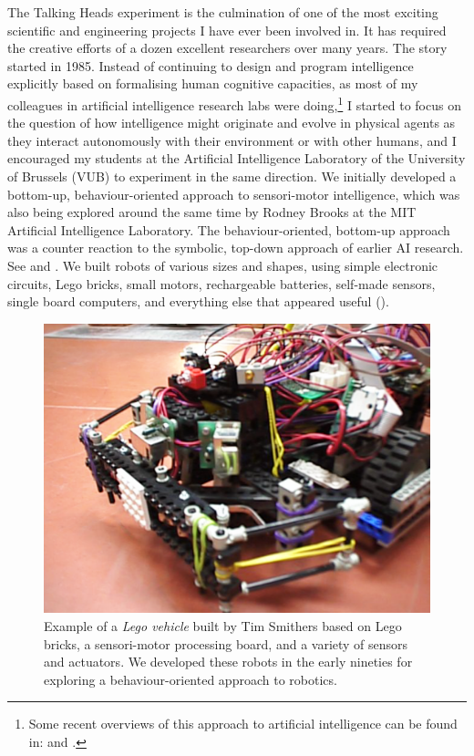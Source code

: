 The Talking Heads experiment is the culmination of one of
the most exciting scientific and engineering projects I have
ever been involved in. It has required the
creative efforts of a dozen excellent researchers 
over many years. The story started in 
1985. Instead of continuing to design and program intelligence
explicitly based on formalising human cognitive
capacities, as most of my colleagues
in artificial intelligence research 
labs were doing,\footnote{
Some recent overviews of this  approach to 
artificial intelligence can be found in: \cite{Nilsson:1998} and 
\cite{Russell:1998}.}
I started to focus on the 
question of how intelligence might
originate and evolve in physical agents as they 
interact autonomously with their environment or with 
other humans, and I encouraged my students
at the Artificial Intelligence Laboratory of the University 
of Brussels (VUB) to experiment in the same direction. 
We initially developed a bottom-up, 
behaviour-oriented approach to sensori-motor intelligence, 
which was also being explored around the same time by 
Rodney Brooks at the MIT Artificial Intelligence 
Laboratory.
The behaviour-oriented, bottom-up approach  was a 
counter reaction to the symbolic, top-down approach of 
earlier AI research. See \cite{Steels:1995} and \cite{Arkin:1998}. 
We built robots of various sizes and shapes, using simple
electronic circuits, Lego bricks, small motors, rechargeable
batteries, self-made 
sensors, single board computers, and everything else that 
appeared useful (). 


\begin{figure}[htbp]
  \centerline{\includegraphics[width=.60\textwidth]{chap1/figs/robot.pdf}}
\caption{Example of a {\itshape Lego vehicle} built by Tim Smithers based on Lego bricks, a sensori-motor processing board, 
and a variety of 
sensors and actuators. We developed these robots in the early nineties for exploring a behaviour-oriented 
approach to robotics.}
\label{f:plate3}
\end{figure}

